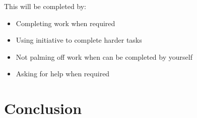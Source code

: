 \documentclass[12pt, a4paper, onecolumn]{article}
\begin{document}
This will be completed by:
\begin{itemize}
  \setlength\itemsep{1px}
  \item Completing work when required
  \item Using initiative to complete harder tasks
  \item Not palming off work when can be completed by yourself
  \item Asking for help when required
\end{itemize}

\newpage
\section{Conclusion}

\newpage
\begin{thebibliography}{9}
\end{thebibliography}

\newpage
\begin{appendices}
\end{appendices}
\end{document}
